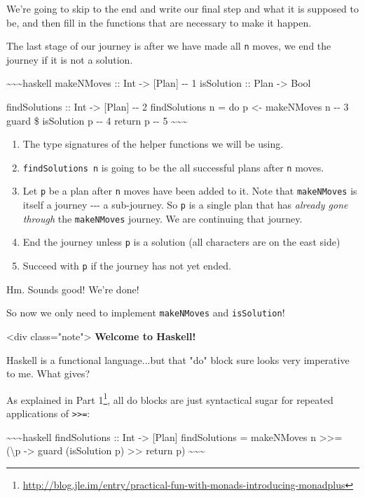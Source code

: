 \documentclass[]{article}
\renewcommand{\href}[2]{#2\footnote{\url{#1}}}
\begin{document}
We're going to skip to the end and write our final step and what it is supposed
to be, and then fill in the functions that are necessary to make it happen.

The last stage of our journey is after we have made all \texttt{n} moves, we end
the journey if it is not a solution.

\textasciitilde{}\textasciitilde{}\textasciitilde{}haskell makeNMoves :: Int
-\textgreater{} {[}Plan{]} -\/- 1 isSolution :: Plan -\textgreater{} Bool

findSolutions :: Int -\textgreater{} {[}Plan{]} -\/- 2 findSolutions n = do p
\textless{}- makeNMoves n -\/- 3 guard \$ isSolution p -\/- 4 return p -\/- 5
\textasciitilde{}\textasciitilde{}\textasciitilde{}

\begin{enumerate}
\tightlist
\item
  The type signatures of the helper functions we will be using.
\item
  \texttt{findSolutions\ n} is going to be the all successful plans after
  \texttt{n} moves.
\item
  Let \texttt{p} be a plan after \texttt{n} moves have been added to it. Note
  that \texttt{makeNMoves} is itself a journey -\/-\/- a sub-journey. So
  \texttt{p} is a single plan that has \emph{already gone through} the
  \texttt{makeNMoves} journey. We are continuing that journey.
\item
  End the journey unless \texttt{p} is a solution (all characters are on the
  east side)
\item
  Succeed with \texttt{p} if the journey has not yet ended.
\end{enumerate}

Hm. Sounds good! We're done!

So now we only need to implement \texttt{makeNMoves} and \texttt{isSolution}!

\textless{}div class="note"\textgreater{} \textbf{Welcome to Haskell!}

Haskell is a functional language...but that "do" block sure looks very
imperative to me. What gives?

As explained in
\href{http://blog.jle.im/entry/practical-fun-with-monads-introducing-monadplus}{Part
1}, all do blocks are just syntactical sugar for repeated applications of
\texttt{\textgreater{}\textgreater{}=}:

\textasciitilde{}\textasciitilde{}\textasciitilde{}haskell findSolutions :: Int
-\textgreater{} {[}Plan{]} findSolutions = makeNMoves n
\textgreater{}\textgreater{}= (\textbackslash{}p -\textgreater{} guard
(isSolution p) \textgreater{}\textgreater{} return p)
\textasciitilde{}\textasciitilde{}\textasciitilde{}
\end{document}
